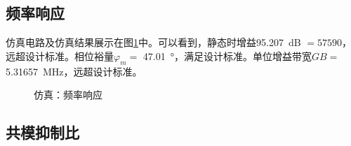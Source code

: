 \documentclass[UTF8]{ctexart}
\numberwithin{figure}{subsection}
\numberwithin{table}{subsection}
\numberwithin{equation}{subsection}
\begin{document}
\subsection{频率响应}
仿真电路及仿真结果展示在图\ref{AC simulation}中。可以看到，静态时增益\SI[]{95.207}{\dB} \( = 57590\)，远超设计标准。相位裕量\(\varphi_m = \) \SI[]{47.01}{\degree}，满足设计标准。单位增益带宽\(GB = \) \SI[]{5.31657}{\MHz}，远超设计标准。

\begin{figure}[H]
    \centering
    \caption{仿真：频率响应}
    \label{AC simulation}
\end{figure}

\subsection{共模抑制比}
\end{document}
